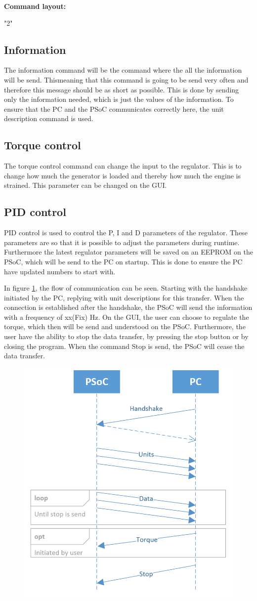 \textbf{Command layout:}

"2"

\subsection{Information}
The information command will be the command where the all the information will be send. Thismeaning that this command is going to be send very often and therefore this message should be as short as possible. This is done by sending only the information needed, which is just the values of the information. To ensure that the PC and the PSoC communicates correctly here, the unit description command is used. 

\subsection{Torque control}
The torque control command  can change the input to the regulator. This is to change how much the generator is loaded and thereby how much the engine is strained. This parameter can be changed on the GUI. 

\subsection{PID control}
PID control is used to control the P, I and D parameters of the regulator. These parameters are so that it is possible to adjust the parameters during runtime. Furthermore the latest regulator parameters will be saved on an EEPROM on the PSoC, which will be send to the PC on startup. This is done to ensure the PC have updated numbers to start with.
          

In figure \ref{fig:TimingDiagram}, the flow of communication can be seen.
Starting with the handshake initiated by the PC, replying with unit descriptions for this transfer. When the connection is established after the handshake, the PSoC will send the information with a frequency of xx\fxnote(Fix) Hz. On the GUI, the user can choose to regulate the torque, which then will be send and understood on the PSoC. Furthermore, the user have the ability to stop the data transfer, by pressing the stop button or by closing the program. When the command Stop is send, the PSoC will cease the data transfer.

\begin{figure}
\centering
\includegraphics[width=0.65\linewidth]{Protocol/TimingDiagram}
\caption{}
\label{fig:TimingDiagram}
\end{figure}

